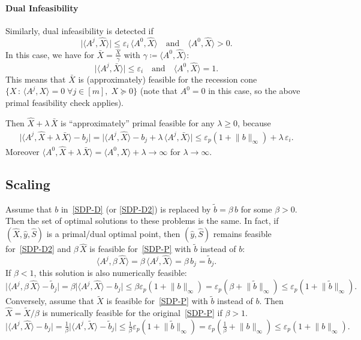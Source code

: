 \documentclass[10pt, a4paper]{article}
\newcommand{\suchthat}{\,:\,}
\newcommand{\abs}[1]{\lvert{#1}\rvert}
\newcommand{\define}{\coloneqq}
\newcommand{\norm}[1]{\lVert{#1}\rVert}
\newcommand{\skal}[2]{\langle{#1},{#2}\rangle}
\begin{document}
\paragraph{Dual Infeasibility}

Similarly, dual infeasibility is detected if
\[
\abs{\skal{A^j}{\hat{X}}} \leq \varepsilon_i\, \skal{A^0}{\hat{X}}
\quad\text{and}\quad \skal{A^0}{\hat{X}} > 0.
\]
In this case, we have for $\bar{X} = \frac{\hat{X}}{\gamma}$ with
$\gamma \define \skal{A^0}{\hat{X}}$:
\[
\abs{\skal{A^j}{\bar{X}}} \leq \varepsilon_i
\quad\text{and}\quad \skal{A^0}{\hat{X}} = 1.
\]
This means that $\bar{X}$ is (approximately) feasible for the recession
cone $\{X \suchthat \skal{A^j}{X} = 0\; \forall j \in [m],\; X \succeq 0\}$
(note that $A^0 = 0$ in this case, so the above primal feasibility check
applies).

Then $\hat{X} + \lambda\, \bar{X}$ is ``approximately'' primal feasible
for any $\lambda \geq 0$, because
\begin{align*}
  \abs{\skal{A^j}{\hat{X} + \lambda\, \bar{X}} - b_j} =
  \abs{\skal{A^j}{\hat{X}} - b_j + \lambda\, \skal{A^j}{\bar{X}}}
  \leq \varepsilon_p (1 + \norm{b}_{\infty}) + \lambda\, \varepsilon_i.
\end{align*}
Moreover
$\skal{A^0}{\hat{X} + \lambda\, \bar{X}} = \skal{A^0}{\hat{X}} + \lambda \to \infty$ for
$\lambda \to \infty$.



\subsection{Scaling}

Assume that $b$ in~\eqref{SDP-D} (or \eqref{SDP-D2}) is replaced by
$\tilde{b} = \beta\, b$ for some $\beta > 0$. Then the set of optimal
solutions to these problems is the same. In fact, if
$(\hat{X},\hat{y},\hat{S})$ is a primal/dual optimal point, then
$(\hat{y},\hat{S})$ remains feasible for~\eqref{SDP-D2} and $\beta\, \hat{X}$ is
feasible for~\eqref{SDP-P} with $\tilde{b}$ instead of $b$:
\[
\skal{A^j}{\beta\, \hat{X}} = \beta\, \skal{A^j}{\hat{X}} = \beta\,b_j = \tilde{b}_j.
\]
If $\beta < 1$, this solution is also numerically feasible:
\[
\abs{\skal{A^j}{\beta\, \hat{X}} - \tilde{b}_j}
= \beta \abs{\skal{A^j}{\hat{X}} - b_j}
\leq \beta \varepsilon_p (1 + \norm{b}_\infty)
= \varepsilon_p (\beta + \norm{\tilde{b}}_\infty) \leq \varepsilon_p (1 + \norm{\tilde{b}}_\infty).
\]
Conversely, assume that $\tilde{X}$ is feasible for~\eqref{SDP-P} with
$\tilde{b}$ instead of $b$. Then $\hat{X} = \tilde{X}/\beta$ is numerically
feasible for the original~\eqref{SDP-P} if $\beta > 1$.
\[
\abs{\skal{A^j}{\hat{X}} - b_j}
= \tfrac{1}{\beta} \abs{\skal{A^j}{\tilde{X}} - \tilde{b}_j}
\leq \tfrac{1}{\beta} \varepsilon_p (1 + \norm{\tilde{b}}_\infty)
= \varepsilon_p (\tfrac{1}{\beta} + \norm{b}_\infty) \leq \varepsilon_p (1 + \norm{b}_\infty).
\]
\end{document}
